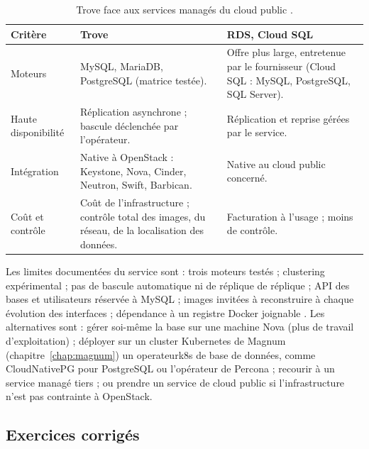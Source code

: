 \begin{table}[!ht]
\centering
\renewcommand{\arraystretch}{1.3}
\begin{tabular}{@{}>{\raggedright\arraybackslash}p{3.0cm}>{\raggedright\arraybackslash}p{6.2cm}>{\raggedright\arraybackslash}p{6.3cm}@{}}
\toprule
\textbf{Critère} & \textbf{Trove} & \textbf{RDS, Cloud SQL} \\
\midrule
Moteurs & MySQL, MariaDB, PostgreSQL (matrice testée). & Offre plus large, entretenue par le fournisseur (Cloud SQL : MySQL, PostgreSQL, SQL Server). \\
Haute disponibilité & Réplication asynchrone ; bascule déclenchée par l'opérateur. & Réplication et reprise gérées par le service. \\
Intégration & Native à OpenStack : Keystone, Nova, Cinder, Neutron, Swift, Barbican. & Native au cloud public concerné. \\
Coût et contrôle & Coût de l'infrastructure ; contrôle total des images, du réseau, de la localisation des données. & Facturation à l'usage ; moins de contrôle. \\
\bottomrule
\end{tabular}
\caption{Trove face aux services managés du cloud public \parencite{trove-datastore,trove-replication,aws-rds,gcp-cloudsql}.}
\label{tab:tr-compar}
\end{table}

Les limites documentées du service sont : trois moteurs testés ; clustering expérimental ; pas de bascule automatique ni de réplique
de réplique ; API des bases et utilisateurs réservée à MySQL ; images invitées à reconstruire à chaque évolution des interfaces ;
dépendance à un registre Docker joignable \parencite{trove-datastore,trove-replication,trove-users,trove-upgrade}. Les alternatives sont :
gérer soi-même la base sur une machine Nova (plus de travail d'exploitation) ; déployer sur un cluster Kubernetes de Magnum
(chapitre~\ref{chap:magnum}) un \gls{operateurk8s} de base de données, comme CloudNativePG pour PostgreSQL \parencite{cloudnativepg} ou
l'opérateur de Percona ; recourir à un service managé tiers ; ou prendre un service de cloud public si l'infrastructure n'est pas
contrainte à OpenStack.

\subsection{Exercices corrigés}\label{sec:tr-exercices}

